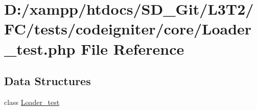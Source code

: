 \hypertarget{tests_2codeigniter_2core_2_loader__test_8php}{}\section{D\+:/xampp/htdocs/\+S\+D\+\_\+\+Git/\+L3\+T2/\+F\+C/tests/codeigniter/core/\+Loader\+\_\+test.php File Reference}
\label{tests_2codeigniter_2core_2_loader__test_8php}
\subsection*{Data Structures}
\begin{DoxyCompactItemize}
\item 
class \hyperlink{class_loader__test}{Loader\+\_\+test}
\end{DoxyCompactItemize}
